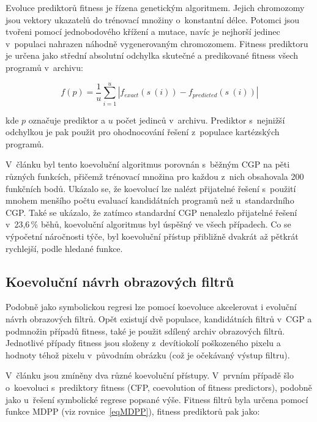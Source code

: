 Evoluce prediktorů fitness je řízena genetickým algoritmem. Jejich chromozomy jsou vektory ukazatelů do trénovací množiny o~konstantní délce. Potomci jsou tvořeni pomocí jednobodového křížení a mutace, navíc je nejhorší jedinec v~populaci nahrazen náhodně vygenerovaným chromozomem. Fitness prediktoru je určena jako střední absolutní odchylka skutečné a predikované fitness všech programů v~archivu:

\begin{equation}
    \label{eqFpredictorSR}
    f \left( p \right) = \frac{1}{u} \sum\limits_{i=1}^{u} \left| f_{\mathit{exact}} \left( s~\left( i \right) \right) - f_{\mathit{predicted}} \left( s~\left( i \right) \right) \right|
\end{equation}

\noindent{}kde $p$ označuje prediktor a $u$ počet jedinců v~archivu. Prediktor s~nejnižší odchylkou je pak použit pro ohodnocování řešení z~populace kartézských programů.

V~článku \cite{SikuEuroGP} byl tento koevoluční algoritmus porovnán s~běžným CGP na pěti různých funkcích, přičemž trénovací množina pro každou z~nich obsahovala 200 funkčních bodů. Ukázalo se, že koevolucí lze nalézt přijatelné řešení s~použití mnohem menšího počtu evaluací kandidátních programů než u~standardního CGP. Také se ukázalo, že zatímco standardní CGP nenalezlo přijatelné řešení v~23,6\,\% běhů, koevoluční algoritmus byl úspěšný ve všech případech. Co se výpočetní náročnosti týče, byl koevoluční přístup přibližně dvakrát až pětkrát rychlejší, podle hledané funkce.


\subsection{Koevoluční návrh obrazových filtrů}
\label{secCoevIF}

Podobně jako symbolickou regresi lze pomocí koevoluce akcelerovat i evoluční návrh obrazových filtrů. Opět existují dvě populace, kandidátních filtrů v~CGP a podmnožin případů fitness, také je použit sdílený archiv obrazových filtrů. Jednotlivé případy fitness jsou složeny z~devítiokolí poškozeného pixelu a hodnoty téhož pixelu v~původním obrázku (což je očekávaný výstup filtru).

V~článku \cite{SikuPPSN} jsou zmíněny dva různé koevoluční přístupy. V~prvním případě šlo o~koevoluci s~prediktory fitness (CFP, coevolution of fitness predictors), podobně jako u~řešení symbolické regrese popsané výše. Fitness filtrů byla určena pomocí funkce MDPP (viz rovnice~\ref{eqMDPP}), fitness prediktorů pak jako:


